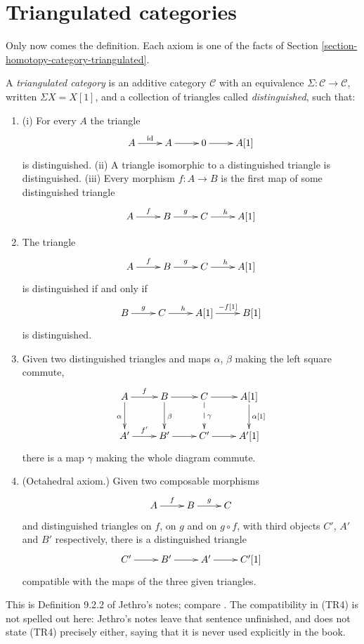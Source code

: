 \section{Triangulated categories}
\label{section-triangulated-categories}

\noindent
Only now comes the definition. Each axiom
is one of the facts of Section
\ref{section-homotopy-category-triangulated}.

\begin{definition}
\label{definition-triangulated-category}
A {\it triangulated category} is an
additive category $\mathcal{C}$ with an
equivalence
$\Sigma:\mathcal{C}\to\mathcal{C}$,
written $\Sigma X=X[1]$, and a collection
of triangles called {\it distinguished},
such that:
\begin{enumerate}
\item[(TR1)] (i) For every $A$ the
triangle
$$
\xymatrix{
A\ar[r]^-{\operatorname{id}}
&A\ar[r]
&0\ar[r]
&A[1]
}
$$
is distinguished. (ii) A triangle
isomorphic to a distinguished triangle is
distinguished. (iii) Every morphism
$f:A\to B$ is the first map of some
distinguished triangle
$$
\xymatrix{
A\ar[r]^{f}
&B\ar[r]^{g}
&C\ar[r]^{h}
&A[1]
}
$$
\item[(TR2)] The triangle
$$
\xymatrix{
A\ar[r]^{f}
&B\ar[r]^{g}
&C\ar[r]^{h}
&A[1]
}
$$
is distinguished if and only if
$$
\xymatrix{
B\ar[r]^{g}
&C\ar[r]^{h}
&A[1]\ar[r]^-{-f[1]}
&B[1]
}
$$
is distinguished.
\item[(TR3)] Given two distinguished
triangles and maps $\alpha$, $\beta$
making the left square commute,
$$
\xymatrix{
A\ar[r]^{f}\ar[d]_{\alpha}
&B\ar[r]\ar[d]^{\beta}
&C\ar[r]\ar@{-->}[d]^{\gamma}
&A[1]\ar[d]^{\alpha[1]}\\
A'\ar[r]^{f'}
&B'\ar[r]
&C'\ar[r]
&A'[1]
}
$$
there is a map $\gamma$ making the whole
diagram commute.
\item[(TR4)] (Octahedral axiom.) Given
two composable morphisms
$$
\xymatrix{
A\ar[r]^{f}
&B\ar[r]^{g}
&C
}
$$
and distinguished triangles on $f$, on
$g$ and on $g\circ f$, with third objects
$C'$, $A'$ and $B'$ respectively, there
is a distinguished triangle
$$
\xymatrix{
C'\ar[r]
&B'\ar[r]
&A'\ar[r]
&C'[1]
}
$$
compatible with the maps of the three
given triangles.
\end{enumerate}
\end{definition}

\noindent
This is Definition 9.2.2 of Jethro's
notes; compare
\cite[Definition 1.32]{huybrechts-fm}.
The compatibility in (TR4) is not
spelled out here: Jethro's notes leave
that sentence unfinished, and
\cite{huybrechts-fm} does not state
(TR4) precisely either, saying that it
is never used explicitly in the book.

